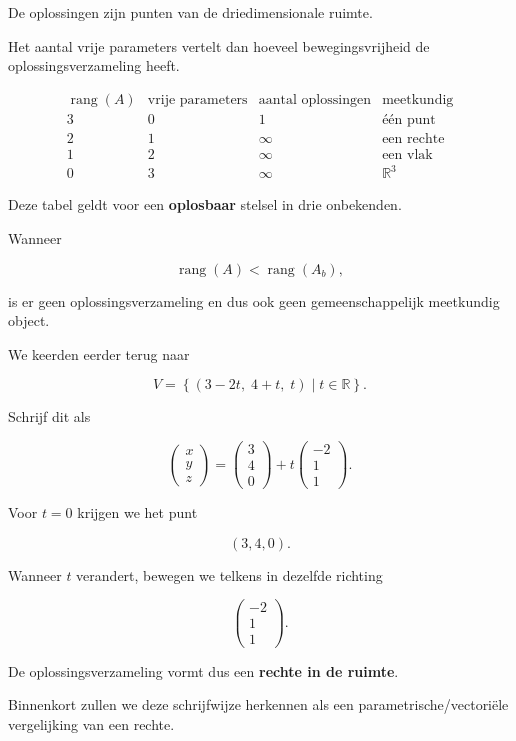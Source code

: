 \documentclass{ximera}
\begin{document}
De oplossingen zijn punten van de driedimensionale ruimte.

Het aantal vrije parameters vertelt dan hoeveel bewegingsvrijheid
de oplossingsverzameling heeft.


\begin{center}
\[
\begin{array}{c|c|c|c}
\operatorname{rang}(A)
&
\text{vrije parameters}
&
\text{aantal oplossingen}
&
\text{meetkundig}
\\
\hline
3&0&1&\text{één punt}\\
2&1&\infty&\text{een rechte}\\
1&2&\infty&\text{een vlak}\\
0&3&\infty&\mathbb{R}^3
\end{array}
\]
\end{center}


\begin{opmerking}
Deze tabel geldt voor een \textbf{oplosbaar} stelsel in drie onbekenden.

Wanneer

\[
\operatorname{rang}(A)<\operatorname{rang}(A_b),
\]

is er geen oplossingsverzameling en dus ook geen gemeenschappelijk
meetkundig object.
\end{opmerking}


\begin{voorbeeld}

We keerden eerder terug naar

\[
V=
\left\{
(3-2t,\;4+t,\;t)
\mid t\in\mathbb{R}
\right\}.
\]

Schrijf dit als

\[
\begin{pmatrix}
x\\y\\z
\end{pmatrix}
=
\begin{pmatrix}
3\\4\\0
\end{pmatrix}
+
t
\begin{pmatrix}
-2\\1\\1
\end{pmatrix}.
\]

Voor \(t=0\) krijgen we het punt

\[
(3,4,0).
\]

Wanneer \(t\) verandert, bewegen we telkens in dezelfde richting

\[
\begin{pmatrix}
-2\\1\\1
\end{pmatrix}.
\]

De oplossingsverzameling vormt dus een \textbf{rechte in de ruimte}.

Binnenkort zullen we deze schrijfwijze herkennen als een
parametrische/vectoriële vergelijking van een rechte.
\end{voorbeeld}
\end{document}
